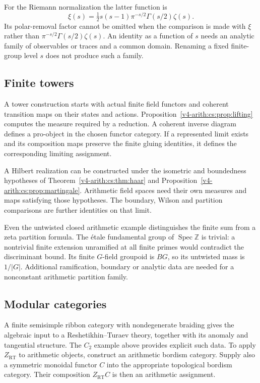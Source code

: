 For the Riemann normalization the latter function is
\[
 \xi(s)=\tfrac12s(s-1)\pi^{-s/2}
                       \Gamma(s/2)\zeta(s).
\]
Its polar-removal factor cannot be omitted when the comparison is made with
\(\xi\) rather than \(\pi^{-s/2}\Gamma(s/2)\zeta(s)\). An identity as a
function of \(s\) needs an analytic family of observables or traces and a
common domain. Renaming a fixed finite-group level \(s\) does not produce
such a family.

\subsection{Finite towers}

A tower construction starts with actual finite field functors and coherent
transition maps on their states and actions.
Proposition~\ref{v4-arith:cs:prop:lifting} computes the measure required by
a reduction. A coherent inverse diagram defines a pro-object in the chosen
functor category. If a represented limit exists and its composition maps
preserve the finite gluing identities, it defines the corresponding limiting
assignment.

A Hilbert realization can be constructed under the isometric and boundedness
hypotheses of Theorem~\ref{v4-arith:cs:thm:haar} and
Proposition~\ref{v4-arith:cs:prop:martingale}. Arithmetic field spaces need
their own measures and maps satisfying those hypotheses. The boundary,
Wilson and partition comparisons are further identities on that limit.

Even the untwisted closed arithmetic example distinguishes the finite sum
from a zeta partition formula. The \'{e}tale fundamental group of
\(\operatorname{Spec}\mathbb Z\) is trivial: a nontrivial finite extension
unramified at all finite primes would contradict the discriminant bound. Its
finite \(G\)-field groupoid is \(BG\), so its untwisted mass is \(1/|G|\).
Additional ramification, boundary or analytic data are needed for a
nonconstant arithmetic partition family.

\subsection{Modular categories}

A finite semisimple ribbon category with nondegenerate braiding gives the
algebraic input to a Reshetikhin--Turaev theory, together with its anomaly
and tangential structure. The \(C_2\) example above provides explicit such
data. To apply \(Z_{\mathrm{RT}}\) to arithmetic objects, construct an
arithmetic bordism category. Supply also a symmetric monoidal functor \(C\)
into the appropriate topological bordism category. Their composition
\(Z_{\mathrm{RT}}C\) is then an arithmetic assignment.

